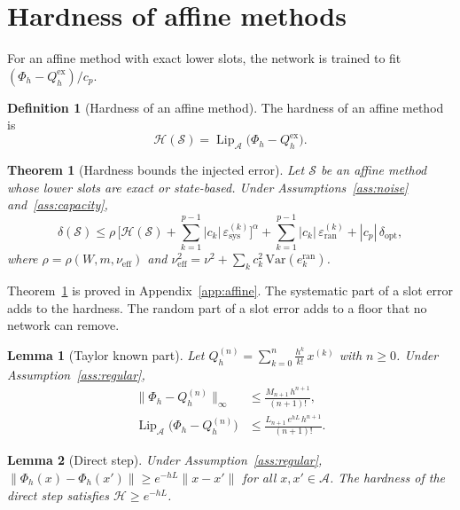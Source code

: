 \documentclass[11pt]{article}
\newtheorem{theorem}{Theorem}
\newtheorem{lemma}{Lemma}
\theoremstyle{definition}
\newtheorem{definition}{Definition}
\theoremstyle{remark}
\newcommand{\Aset}{\mathcal{A}}          %
\newcommand{\Meth}{\mathcal{S}}          %
\newcommand{\Hard}{\mathcal{H}}          %
\newcommand{\Lip}{\operatorname{Lip}_{\Aset}}
\newcommand{\supA}[1]{\|#1\|_{\infty}}
\newcommand{\sys}{\mathrm{sys}}
\newcommand{\ran}{\mathrm{ran}}
\newcommand{\ex}{\mathrm{ex}}
\begin{document}
\section{Hardness of affine methods}\label{sec:affine}

For an affine method with exact lower slots, the network is trained to fit $(\Phi_h - Q_h^\ex)/c_p$.

\begin{definition}[Hardness of an affine method]\label{def:hardness}
The hardness of an affine method is
\begin{equation}\label{eq:hardness}
\Hard(\Meth) = \Lip\big(\Phi_h - Q_h^\ex\big).
\end{equation}
\end{definition}

\begin{theorem}[Hardness bounds the injected error]\label{thm:affine}
Let $\Meth$ be an affine method whose lower slots are exact or state-based.
Under Assumptions~\ref{ass:noise} and~\ref{ass:capacity},
\begin{equation}\label{eq:thm1}
\delta(\Meth) \le \rho\,\Big[\Hard(\Meth) + \sum_{k=1}^{p-1} |c_k|\, \varepsilon^{(k)}_\sys\Big]^{\alpha}
+ \sum_{k=1}^{p-1} |c_k|\, \varepsilon^{(k)}_\ran + |c_p|\,\delta_{\mathrm{opt}},
\end{equation}
where $\rho = \rho(W, m, \nu_{\mathrm{eff}})$ and $\nu_{\mathrm{eff}}^2 = \nu^2 + \sum_{k} c_k^2\, \mathrm{Var}(e_k^\ran)$.
\end{theorem}

Theorem~\ref{thm:affine} is proved in Appendix~\ref{app:affine}.
The systematic part of a slot error adds to the hardness.
The random part of a slot error adds to a floor that no network can remove.

\begin{lemma}[Taylor known part]\label{lem:taylor}
Let $Q^{(n)}_h = \sum_{k=0}^{n} \frac{h^k}{k!}\, x^{(k)}$ with $n \ge 0$.
Under Assumption~\ref{ass:regular},
\begin{align}
\supA{\Phi_h - Q^{(n)}_h} &\le \frac{M_{n+1}\, h^{n+1}}{(n+1)!}, \label{eq:taylorsup}\\
\Lip\big(\Phi_h - Q^{(n)}_h\big) &\le \frac{L_{n+1}\, e^{hL}\, h^{n+1}}{(n+1)!}. \label{eq:taylorlip}
\end{align}
\end{lemma}

\begin{lemma}[Direct step]\label{lem:direct}
Under Assumption~\ref{ass:regular}, $\|\Phi_h(x) - \Phi_h(x')\| \ge e^{-hL}\|x - x'\|$ for all $x, x' \in \Aset$.
The hardness of the direct step satisfies $\Hard \ge e^{-hL}$.
\end{lemma}
\end{document}
